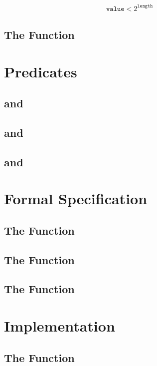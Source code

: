 \begin{align}
\label{eq:bit-stream-write-pre}
    \mathtt{value} < 2^{\mathtt{length}}
\end{align}

\subsection{The Function }

\section{Predicates}
\subsection{ and }
\subsection{ and }
\subsection{ and }
\subsection{}

\section{Formal Specification}
\subsection{The Function \bitstreamread}
\subsection{The Function }
\subsection{The Function }

\section{Implementation}
\subsection{The Function \bitstreamread}
